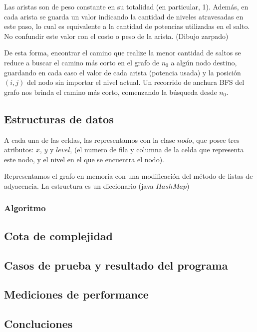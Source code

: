 Las aristas son de peso constante en su totalidad (en particular, 1). Adem\'as, en cada arista se guarda un valor indicando la cantidad de niveles atravesadas en este paso, lo cual es equivalente a la cantidad de potencias utilizadas en el salto. No confundir este valor con el costo o peso de la arista.
\vspace{2mm}
(Dibujo zarpado)
\vspace{2mm}

De esta forma, encontrar el camino que realize la menor cantidad de saltos se reduce a buscar el camino m\'as corto en el grafo de $n_0$ a alg\'un nodo destino, guardando en cada caso el valor de cada arista (potencia usada) y la posici\'on $(i,j)$ del nodo sin importar el nivel actual. Un recorrido de anchura BFS del grafo nos brinda el camino m\'as corto, comenzando la b\'usqueda desde $n_0$.

\subsection{Estructuras de datos}

A cada una de las celdas, las representamos con la clase $nodo$, que posee tres atributos: $x$, $y$ y $level$, (el numero de fila y columna de la celda que representa este nodo, y el nivel en el que se encuentra el nodo).

\vspace{2mm}

Representamos el grafo en memoria con una modificaci\'on del m\'etodo de listas de adyacencia. La estructura es un diccionario (java $HashMap$)

\subsubsection{Algoritmo} \label{ej_3:algoritmo}


\subsection{Cota de complejidad} \label{ej_3:cota}

\subsection{Casos de prueba y resultado del programa} \label{ej_3:casos}

\subsection{Mediciones de performance} \label{ej_3:performance}

\subsection{Concluciones} \label{ej_3:concluciones}

